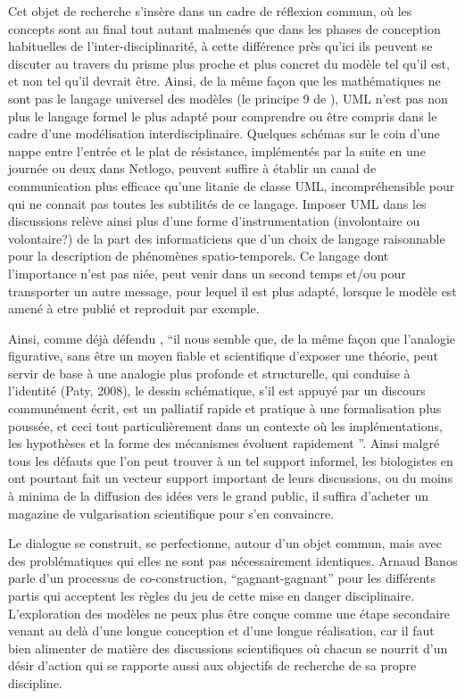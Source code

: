 Cet objet de recherche s'insère dans un cadre de réflexion commun, où les concepts sont au final tout autant malmenés que dans les phases de conception habituelles de l'inter-disciplinarité, à cette différence près qu'ici ils peuvent se discuter au travers du prisme plus proche et plus concret du modèle tel qu'il est, et non tel qu'il devrait être. Ainsi, de la même façon que les mathématiques ne sont pas le langage universel des modèles (le principe 9 de \textcite[82]{Banos2013}), UML n'est pas non plus le langage formel le plus adapté pour comprendre ou être compris dans le cadre d'une modélisation interdisciplinaire. Quelques schémas sur le coin d'une nappe entre l'entrée et le plat de résistance, implémentés par la suite en une journée ou deux dans Netlogo, peuvent suffire à établir un canal de communication plus efficace qu'une litanie de classe UML, incompréhensible pour qui ne connait pas toutes les subtilités de ce langage. Imposer UML dans les discussions relève ainsi plus d'une forme d'instrumentation (involontaire ou volontaire?) de la part des informaticiens que d'un choix de langage raisonnable pour la description de phénomènes spatio-temporels. Ce langage dont l'importance n'est pas niée, peut venir dans un second temps et/ou pour transporter un autre message, pour lequel il est plus adapté, lorsque le modèle est amené à etre publié et reproduit par exemple.

Ainsi, comme déjà défendu \textcite{Chapron2014}, \enquote{il nous semble que, de la même façon que l’analogie figurative, sans être un moyen fiable et scientifique d’exposer une théorie, peut servir de base à une analogie plus profonde et structurelle, qui conduise à l’identité (Paty, 2008), le dessin schématique, s’il est appuyé par un discours communément écrit, est un palliatif rapide et pratique à une formalisation plus poussée, et ceci tout particulièrement dans un contexte où les implémentations, les hypothèses et la forme des mécanismes évoluent rapidement \autocite[16-17]{Machamer2000}}. Ainsi malgré tous les défauts que l'on peut trouver à un tel support informel, les biologistes en ont pourtant fait un vecteur support important de leurs discussions, ou du moins à minima de la diffusion des idées vers le grand public, il suffira d'acheter un magazine de vulgarisation scientifique pour s'en convaincre.

Le dialogue se construit, se perfectionne, autour d'un objet commun, mais avec des problématiques qui elles ne sont pas nécessairement identiques. Arnaud Banos parle d'un processus de co-construction, \enquote{gagnant-gagnant} pour les différents partis qui acceptent les règles du jeu de cette mise en danger disciplinaire. L'exploration des modèles ne peux plus être conçue comme une étape secondaire venant au delà d'une longue conception et d'une longue réalisation, car il faut bien alimenter de matière des discussions scientifiques où chacun se nourrit d'un désir d'action qui se rapporte aussi aux objectifs de recherche de sa propre discipline.

